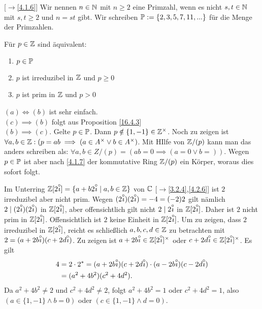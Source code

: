 \documentclass[../../main.tex]{subfiles}
\begin{document}
\begin{er}\mbox{}[$\to$\ref{4.1.6}]
\label{16.4.5}
Wir nennen $n\in \N$ mit $n\ge 2$ eine Primzahl, wenn es nicht $s,t\in \N$ mit $s,t\ge 2$ und $n=st$ gibt. Wir schreiben $\P:=\{2,3,5,7,11,...\}$ für die Menge der Primzahlen.
\end{er}

\begin{pro}\label{16.4.6}
Für $p\in \Z$ sind äquivalent:
\begin{enumerate}[\normalfont(a)]
\item $p\in \P$
\item $p$ ist irreduzibel in $\Z$ und $p\ge 0$
\item $p$ ist prim in $\Z$ und $p>0$
\end{enumerate}
\end{pro}
\begin{cproof}
\underline{$(a)\Longleftrightarrow (b)$} ist sehr einfach.\\

\noindent \underline{$(c)\implies (b)$} folgt aus Proposition \ref{16.4.3}\\

\noindent \underline{$(b)\implies (c)$}. Gelte $p\in \P$. Dann $p\notin\{1,-1\}\in \Z^\times$. Noch zu zeigen ist $\forall a,b\in \Z:(p=ab\implies (a\in A^\times\lor b\in A^\times)$. Mit HIlfe von $\Z/(p)$ kann man das anders schreiben als: $\forall a,b\in Z/(p)=(ab=0\implies(a=0\lor b=))$. Wegen $p\in \P$ ist aber nach \ref{4.1.7} der kommutative Ring $\Z/(p)$ ein Körper, woraus dies sofort folgt.
\end{cproof}

\begin{bsp}\label{16.4.7}
Im Unterring $\Z[2\i]=\{a+b2\i\mid a,b\in \Z\}$ von $\C$ [$\to$\ref{3.2.4},\ref{4.2.6}] ist $2$ irreduzibel aber nicht prim. Wegen $(2\i)(2\i)=-4=(-2)2$ gilt nämlich $2\mid (2\i)(2\i)$ in $\Z[2\i]$, aber offensichtlich gilt nicht $2\mid 2\i$ in $\Z[2\i]$. Daher ist $2$ nicht prim in $\Z[2\i]$. Offensichtlich ist $2$ keine Einheit in $\Z[2\i]$. Um zu zeigen, dass $2$ irreduzibel in $\Z[2\i]$, reicht es schließlich $a,b,c,d\in \Z$ zu betrachten mit $2=(a+2b\i)(c+2d\i)$. Zu zeigen ist $a+2b\i\in \Z[2\i]^\times$ oder $c+2d\i\in\Z[2\i]^\times$. Es gilt
\begin{align*}
4&=2\cdot 2^*=(a+2b\i)(c+2d\i)\cdot (a-2b\i)(c-2d\i)\\
&=(a^2+4b^2)(c^2+4d^2).
\end{align*}
Da $a^2+4b^2\neq 2$ und $c^2+4d^2\neq 2$, folgt $a^2+4b^2=1$ oder $c^2+4d^2=1$, also $(a\in\{1,-1\}\land b=0)$ oder $(c\in\{1,-1\}\land d=0)$.
\end{bsp}
\end{document}
